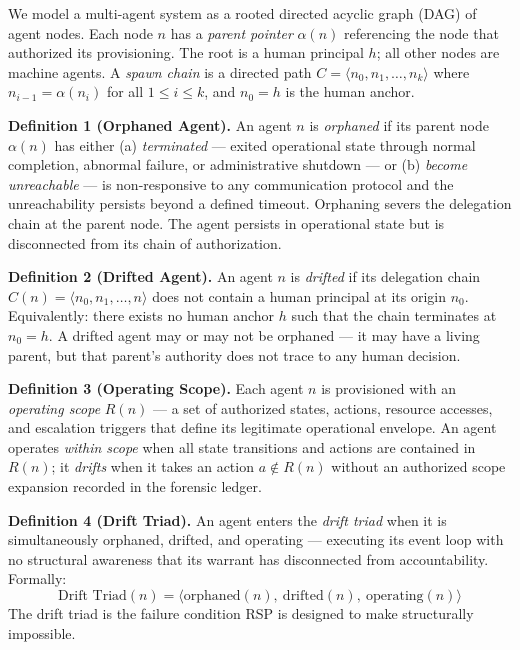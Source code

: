We model a multi-agent system as a rooted directed acyclic graph (DAG) of agent nodes. Each node $n$ has a \emph{parent pointer} $\alpha(n)$ referencing the node that authorized its provisioning. The root is a human principal $h$; all other nodes are machine agents. A \emph{spawn chain} is a directed path $C = \langle n_0, n_1, \ldots, n_k \rangle$ where $n_{i-1} = \alpha(n_i)$ for all $1 \leq i \leq k$, and $n_0 = h$ is the human anchor.

\medskip
\noindent\textbf{Definition 1 (Orphaned Agent).} An agent $n$ is \emph{orphaned} if its parent node $\alpha(n)$ has either (a) \emph{terminated} — exited operational state through normal completion, abnormal failure, or administrative shutdown — or (b) \emph{become unreachable} — is non-responsive to any communication protocol and the unreachability persists beyond a defined timeout. Orphaning severs the delegation chain at the parent node. The agent persists in operational state but is disconnected from its chain of authorization.

\medskip
\noindent\textbf{Definition 2 (Drifted Agent).} An agent $n$ is \emph{drifted} if its delegation chain $C(n) = \langle n_0, n_1, \ldots, n \rangle$ does not contain a human principal at its origin $n_0$. Equivalently: there exists no human anchor $h$ such that the chain terminates at $n_0 = h$. A drifted agent may or may not be orphaned — it may have a living parent, but that parent's authority does not trace to any human decision.

\medskip
\noindent\textbf{Definition 3 (Operating Scope).} Each agent $n$ is provisioned with an \emph{operating scope} $R(n)$ — a set of authorized states, actions, resource accesses, and escalation triggers that define its legitimate operational envelope. An agent operates \emph{within scope} when all state transitions and actions are contained in $R(n)$; it \emph{drifts} when it takes an action $a \notin R(n)$ without an authorized scope expansion recorded in the forensic ledger.

\medskip
\noindent\textbf{Definition 4 (Drift Triad).} An agent enters the \emph{drift triad} when it is simultaneously orphaned, drifted, and operating — executing its event loop with no structural awareness that its warrant has disconnected from accountability. Formally:
\begin{equation}
\text{Drift Triad}(n) = \bigl\langle \text{orphaned}(n),\ \text{drifted}(n),\ \text{operating}(n) \bigr\rangle
\label{eq:intro-drift-triad}
\end{equation}
The drift triad is the failure condition RSP is designed to make structurally impossible.

